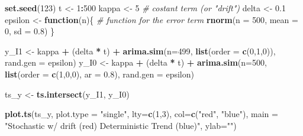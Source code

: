 \documentclass[
]{article}
\newenvironment{Shaded}{\begin{snugshade}}{\end{snugshade}}
\newcommand{\AttributeTok}[1]{\textcolor[rgb]{0.13,0.29,0.53}{#1}}
\newcommand{\CommentTok}[1]{\textcolor[rgb]{0.56,0.35,0.01}{\textit{#1}}}
\newcommand{\ControlFlowTok}[1]{\textcolor[rgb]{0.13,0.29,0.53}{\textbf{#1}}}
\newcommand{\DecValTok}[1]{\textcolor[rgb]{0.00,0.00,0.81}{#1}}
\newcommand{\FloatTok}[1]{\textcolor[rgb]{0.00,0.00,0.81}{#1}}
\newcommand{\FunctionTok}[1]{\textcolor[rgb]{0.13,0.29,0.53}{\textbf{#1}}}
\newcommand{\NormalTok}[1]{#1}
\newcommand{\OtherTok}[1]{\textcolor[rgb]{0.56,0.35,0.01}{#1}}
\newcommand{\SpecialCharTok}[1]{\textcolor[rgb]{0.81,0.36,0.00}{\textbf{#1}}}
\newcommand{\StringTok}[1]{\textcolor[rgb]{0.31,0.60,0.02}{#1}}
\begin{document}
\begin{Shaded}
\begin{Highlighting}[]
\FunctionTok{set.seed}\NormalTok{(}\DecValTok{123}\NormalTok{)}
\NormalTok{t }\OtherTok{\textless{}{-}} \DecValTok{1}\SpecialCharTok{:}\DecValTok{500} 
\NormalTok{kappa }\OtherTok{\textless{}{-}} \DecValTok{5} \CommentTok{\# costant term (or "drift")}
\NormalTok{delta }\OtherTok{\textless{}{-}} \FloatTok{0.1} 
\NormalTok{epsilon }\OtherTok{\textless{}{-}} \ControlFlowTok{function}\NormalTok{(n)\{ }\CommentTok{\# function for the error term}
    \FunctionTok{rnorm}\NormalTok{(}\AttributeTok{n =} \DecValTok{500}\NormalTok{, }\AttributeTok{mean =} \DecValTok{0}\NormalTok{, }\AttributeTok{sd =} \FloatTok{0.8}\NormalTok{)}
\NormalTok{    \} }

\NormalTok{y\_I1 }\OtherTok{\textless{}{-}}\NormalTok{ kappa }\SpecialCharTok{+}\NormalTok{ (delta }\SpecialCharTok{*}\NormalTok{ t) }\SpecialCharTok{+} \FunctionTok{arima.sim}\NormalTok{(}\AttributeTok{n=}\DecValTok{499}\NormalTok{, }\FunctionTok{list}\NormalTok{(}\AttributeTok{order =} \FunctionTok{c}\NormalTok{(}\DecValTok{0}\NormalTok{,}\DecValTok{1}\NormalTok{,}\DecValTok{0}\NormalTok{)), }
                                        \AttributeTok{rand.gen =}\NormalTok{ epsilon)}
\NormalTok{y\_I0 }\OtherTok{\textless{}{-}}\NormalTok{ kappa }\SpecialCharTok{+}\NormalTok{ (delta }\SpecialCharTok{*}\NormalTok{ t) }\SpecialCharTok{+} \FunctionTok{arima.sim}\NormalTok{(}\AttributeTok{n=}\DecValTok{500}\NormalTok{, }\FunctionTok{list}\NormalTok{(}\AttributeTok{order =} \FunctionTok{c}\NormalTok{(}\DecValTok{1}\NormalTok{,}\DecValTok{0}\NormalTok{,}\DecValTok{0}\NormalTok{), }\AttributeTok{ar =} \FloatTok{0.8}\NormalTok{),}
                                        \AttributeTok{rand.gen =}\NormalTok{ epsilon)}

\NormalTok{ts\_y }\OtherTok{\textless{}{-}} \FunctionTok{ts.intersect}\NormalTok{(y\_I1, y\_I0)}

\FunctionTok{plot.ts}\NormalTok{(ts\_y, }\AttributeTok{plot.type =} \StringTok{"single"}\NormalTok{, }
        \AttributeTok{lty=}\FunctionTok{c}\NormalTok{(}\DecValTok{1}\NormalTok{,}\DecValTok{3}\NormalTok{), }\AttributeTok{col=}\FunctionTok{c}\NormalTok{(}\StringTok{"red"}\NormalTok{, }\StringTok{"blue"}\NormalTok{),}
        \AttributeTok{main =} \StringTok{"Stochastic w/ drift (red) Deterministic Trend (blue)"}\NormalTok{,}
        \AttributeTok{ylab=}\StringTok{""}\NormalTok{)}
\end{Highlighting}
\end{Shaded}
\end{document}
